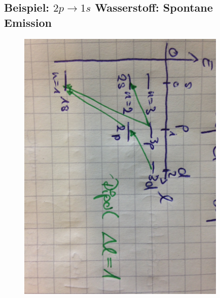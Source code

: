 	\subsection{Beispiel: $2p \rightarrow 1s$ Wasserstoff: Spontane Emission}
		\begin{figure} [h]
			\begin{center}
				\includegraphics[width=10cm]{Bild3.jpg}
			\end{center}
		\end{figure}